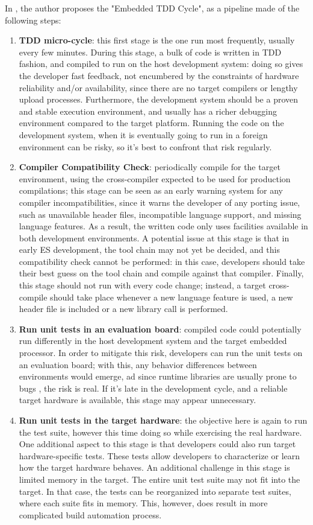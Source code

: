 \noindent In \cite{TDDEC}, the author proposes the "Embedded TDD Cycle", as a pipeline made of the following steps:
\begin{enumerate}
    \item \textbf{TDD micro-cycle}: this first stage is the one run most frequently, usually every few minutes. During this stage, a bulk of code is written in TDD fashion, and compiled to run on the host development system: doing so gives the developer fast feedback, not encumbered by the constraints of hardware reliability and/or availability, since there are no target compilers or lengthy upload processes. Furthermore, the development system should be a proven and stable execution environment, and usually has a richer debugging environment compared to the target platform. 
    Running the code on the development system, when it is eventually going to run in a foreign environment can be risky, so it's best to confront that risk regularly.
    \item \textbf{Compiler Compatibility Check}: periodically compile for the target environment, using the cross-compiler expected to be used for production compilations; this stage can be seen as an early warning system for any compiler incompatibilities, since it warns the developer of any porting issue, such as unavailable header files, incompatible language support, and missing language features. As a result, the written code only uses facilities available in both development environments.
    A potential issue at this stage is that in early ES development, the tool chain may not yet be decided, and this compatibility check cannot be performed: in this case, developers should take their best guess on the tool chain and compile against that compiler.
    Finally, this stage should not run with every code change; instead, a target cross-compile should take place whenever a new language feature is used, a new header file is included or a new library call is performed.
    \item \textbf{Run unit tests in an evaluation board}: compiled code could potentially run differently in the host development system and the target embedded processor. In order to mitigate this risk, developers can run the unit tests on an evaluation board; with this, any behavior differences between environments would emerge, ad since runtime libraries are usually prone to bugs \cite{TDDEC}, the risk is real. If it's late in the development cycle, and a reliable target hardware is available, this stage may appear unnecessary.
    \item \textbf{Run unit tests in the target hardware}: the objective here is again to run the test suite, however this time doing so while exercising the real hardware. One additional aspect to this stage is that developers could also run target hardware-specific tests. These tests allow developers to characterize or learn how the target hardware behaves. An additional challenge in this stage is limited memory in the target. The entire unit test suite may not fit into the target. In that case, the tests can be reorganized into separate test suites, where each suite fits in memory. This, however, does result in more complicated build automation process.

\end{enumerate}
